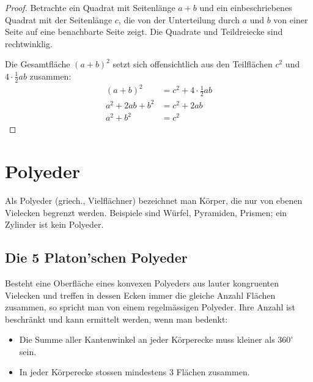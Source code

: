 \documentclass[%
11pt,%
twoside,%
titlepage,%
swissgerman,%
headsepline%
]{scrartcl}
\newcommand{\definition}[1]{\colorbox{emerald}{#1}}
\theoremstyle{definition}
\theoremstyle{plain}
\begin{document}
\begin{proof}
    Betrachte ein Quadrat mit Seitenlänge $a+b$ und ein einbeschriebenes Quadrat mit der Seitenlänge $c$, die von der Unterteilung durch $a$ und $b$ von einer Seite auf eine benachbarte Seite zeigt. Die Quadrate und Teildreiecke sind rechtwinklig.

    \begin{center}
    \end{center}
    Die Gesamtfläche $(a+b)^2$ setzt sich offensichtlich aus den Teilflächen $c^2$ und $4\cdot \frac{1}{2}ab$ zusammen:
    \begin{align*}
        (a+b)^2 &= c^2+4\cdot \frac{1}{2}ab\\
        a^2+2ab+b^2 &= c^2 +2ab\\
        a^2+b^2 &= c^2
    \end{align*}
\end{proof}

\clearpage

\section{Polyeder}
Als Polyeder (griech., Vielfl\"achner) bezeichnet man K\"orper, die nur von ebenen Vielecken begrenzt werden. Beispiele sind W\"urfel, Pyramiden, Prismen; ein Zylinder ist kein Polyeder.

\subsection{Die 5 Platon'schen Polyeder}

Besteht eine Oberfl\"ache eines konvexen Polyeders aus lauter kongruenten Vielecken und treffen in dessen Ecken immer die gleiche Anzahl Fl\"achen zusammen, so spricht man von einem \definition{regelm\"assigen Polyeder}. Ihre Anzahl ist beschr\"ankt und kann ermittelt werden, wenn man bedenkt:
\begin{itemize}
\item Die Summe aller Kantenwinkel an jeder K\"orperecke muss kleiner als $360^\circ$ sein.
\item In jeder K\"orperecke stossen mindestens $3$ Fl\"achen zusammen.
\end{itemize}
\end{document}
